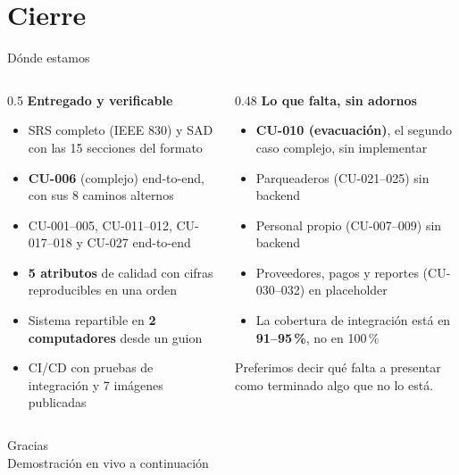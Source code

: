 \documentclass[aspectratio=169,10pt,xcolor={table}]{beamer}
\begin{document}
\section{Cierre}

\begin{frame}{Dónde estamos}
  \begin{columns}[T]
    \begin{column}{0.5\textwidth}
      \textbf{Entregado y verificable}
      \begin{itemize}\small
        \item SRS completo (IEEE 830) y SAD con las 15 secciones del formato
        \item \textbf{CU-006} (complejo) end-to-end, con sus 8 caminos alternos
        \item CU-001--005, CU-011--012, CU-017--018 y CU-027 end-to-end
        \item \textbf{5 atributos} de calidad con cifras reproducibles en una orden
        \item Sistema repartible en \textbf{2 computadores} desde un guion
        \item CI/CD con pruebas de integración y 7 imágenes publicadas
      \end{itemize}
    \end{column}
    \begin{column}{0.48\textwidth}
      \textbf{Lo que falta, sin adornos}
      \begin{itemize}\small
        \item \textbf{CU-010 (evacuación)}, el segundo caso complejo, sin implementar
        \item Parqueaderos (CU-021--025) sin backend
        \item Personal propio (CU-007--009) sin backend
        \item Proveedores, pagos y reportes (CU-030--032) en placeholder
        \item La cobertura de integración está en \textbf{91--95\,\%}, no en 100\,\%
      \end{itemize}
      \vspace{0.4em}
      \begin{alertblock}{}
        \small Preferimos decir qué falta a presentar como terminado algo que no lo está.
      \end{alertblock}
    \end{column}
  \end{columns}
\end{frame}

\begin{frame}[standout]
  Gracias \\[0.5em]
  \small Demostración en vivo a continuación
\end{frame}
\end{document}
